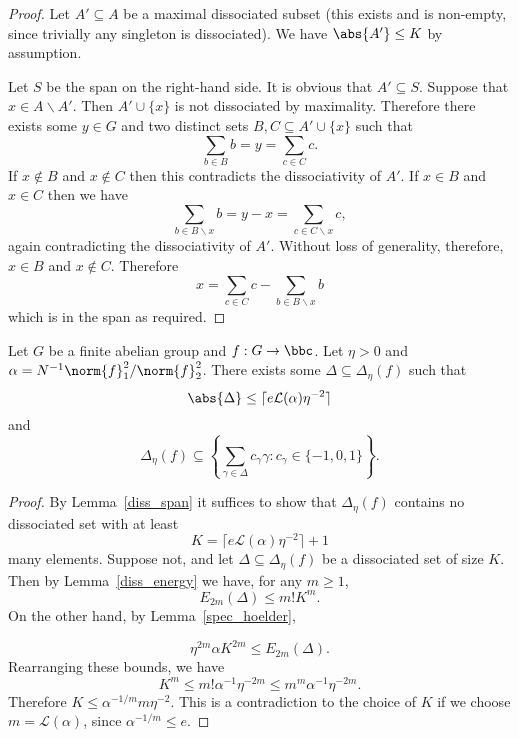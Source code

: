\begin{proof}
\leanok
Let $A'\subseteq A$ be a maximal dissociated subset (this exists and is non-empty, since trivially any singleton is dissociated). We have $\abs{A'}\leq K$ by assumption.

Let $S$ be the span on the right-hand side. It is obvious that $A'\subseteq S$. Suppose that $x\in A\backslash A'$. Then $A'\cup\{x\}$ is not dissociated by maximality. Therefore there exists some $y\in G$ and two distinct sets $B,C\subseteq A'\cup \{x\}$ such that
\[\sum_{b\in B}b = y = \sum_{c\in C} c.\]
If $x\not\in B$ and $x\not\in C$ then this contradicts the dissociativity of $A'$. If $x\in B$ and $x\in C$ then we have
\[\sum_{b\in B\backslash x}b=y-x=\sum_{c\in C\backslash x}c,\]
again contradicting the dissociativity of $A'$. Without loss of generality, therefore, $x\in B$ and $x\not\in C$. Therefore
\[x=\sum_{c\in C}c - \sum_{b\in B\backslash x}b\]
which is in the span as required.
\end{proof}


\begin{theorem}
\label{chang}
\leanok
Let $G$ be a finite abelian group and $f:G\to \bbc$. Let $\eta >0$ and $\alpha=N^{-1}\norm{f}_1^2/\norm{f}_2^2$. There exists some $\Delta\subseteq \Delta_\eta(f)$ such that
\[\abs{\Delta}\leq \lceil e\mathcal{L}(\alpha)\eta^{-2}\rceil \]
and
\[\Delta_\eta(f)\subseteq \left\{ \sum_{\gamma\in\Delta}c_\gamma \gamma : c_\gamma\in \{-1,0,1\} \right\}.\]
\end{theorem}

\begin{proof}
\leanok
By Lemma~\ref{diss_span} it suffices to show that $\Delta_\eta(f)$ contains no dissociated set with at least
\[K= \lceil e\mathcal{L}(\alpha)\eta^{-2}\rceil+1\]
many elements. Suppose not, and let $\Delta\subseteq \Delta_\eta(f)$ be a dissociated set of size $K$. Then by Lemma~\ref{diss_energy} we have, for any $m\geq 1$,
\[E_{2m}(\Delta)\leq m!K^m.\]
On the other hand, by Lemma~\ref{spec_hoelder},

\[\eta^{2m}\alpha K^{2m}\leq E_{2m}(\Delta).\]
Rearranging these bounds, we have
\[K^m \leq m! \alpha^{-1}\eta^{-2m}\leq m^m\alpha^{-1}\eta^{-2m}.\]
Therefore $K\leq \alpha^{-1/m}m\eta^{-2}$. This is a contradiction to the choice of $K$ if we choose $m=\mathcal{L}(\alpha)$, since $\alpha^{-1/m}\leq e$.
\end{proof}
